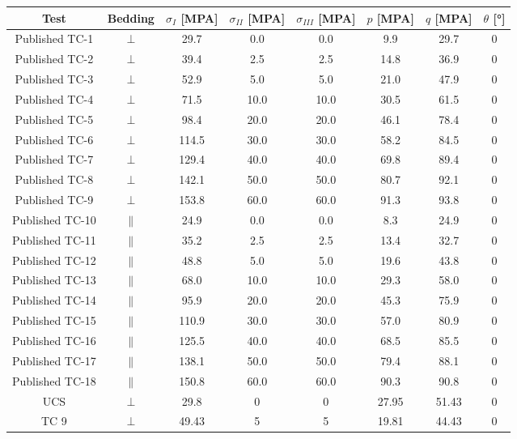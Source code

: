 \begin{table}
    \centering
    \begin{tabular}{cccccccc}
        \hline 
        Test & Bedding & $\sigma_I$ [\si{MPA}] & $\sigma_{II}$ [\si{MPA}] &$\sigma_{III}$ [\si{MPA}] & $p$ [\si{MPA}] & $q$ [\si{MPA}] & $\theta$ [\si{\degree}] \\
        \hline
        \hline
        Published TC-1 & \(\perp\) & 29.7 & 0.0 & 0.0 & 9.9 & 29.7 & 0 \\
        Published TC-2 & \(\perp\) & 39.4 & 2.5 & 2.5 & 14.8 & 36.9 & 0 \\
        Published TC-3 & \(\perp\) & 52.9 & 5.0 & 5.0 & 21.0 & 47.9 & 0 \\
        Published TC-4 & \(\perp\) & 71.5 & 10.0 & 10.0 & 30.5 & 61.5 & 0 \\
        Published TC-5 & \(\perp\) & 98.4 & 20.0 & 20.0 & 46.1 & 78.4 & 0 \\
        Published TC-6 & \(\perp\) & 114.5 & 30.0 & 30.0 & 58.2 & 84.5 & 0 \\
        Published TC-7 & \(\perp\)& 129.4 & 40.0 & 40.0 & 69.8 & 89.4 & 0 \\
        Published TC-8 & \(\perp\) & 142.1 & 50.0 & 50.0 & 80.7 & 92.1 & 0 \\
        Published TC-9 & \(\perp\) & 153.8 & 60.0 & 60.0 & 91.3 & 93.8 & 0 \\
        Published TC-10 & \(\|\) & 24.9 & 0.0 & 0.0 & 8.3 & 24.9 & 0 \\
        Published TC-11 & \(\|\) & 35.2 & 2.5 & 2.5 & 13.4 & 32.7 & 0 \\
        Published TC-12 & \(\|\) & 48.8 & 5.0 & 5.0 & 19.6 & 43.8 & 0 \\
        Published TC-13 & \(\|\) & 68.0 & 10.0 & 10.0 & 29.3 & 58.0 & 0 \\
        Published TC-14 & \(\|\) & 95.9 & 20.0 & 20.0 & 45.3 & 75.9 & 0 \\
        Published TC-15 & \(\|\) & 110.9 & 30.0 & 30.0 & 57.0 & 80.9 & 0 \\
        Published TC-16 & \(\|\) & 125.5 & 40.0 & 40.0 & 68.5 & 85.5 & 0 \\
        Published TC-17 & \(\|\) & 138.1 & 50.0 & 50.0 & 79.4 & 88.1 & 0 \\
        Published TC-18 & \(\|\) & 150.8 & 60.0 & 60.0 & 90.3 & 90.8 & 0 \\
        UCS   & \(\perp\) & 29.8 & 0 & 0   & 27.95 & 51.43 & 0 \\ 
        TC 9  & \(\perp\) & 49.43 & 5  & 5 & 19.81 & 44.43 & 0 \\ 

\end{tabular}
\end{table}
